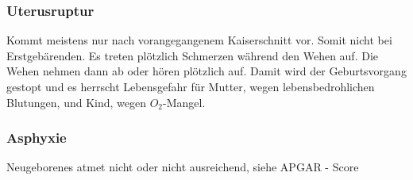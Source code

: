 \subsubsection{Uterusruptur}

Kommt meistens nur nach vorangegangenem Kaiserschnitt vor. Somit nicht bei
Erstgebärenden. Es treten plötzlich Schmerzen während den Wehen auf. Die Wehen
nehmen dann ab oder hören plötzlich auf. Damit wird der Geburtsvorgang gestopt
und es herrscht Lebensgefahr für Mutter, wegen lebensbedrohlichen Blutungen, und
Kind, wegen $O_2$-Mangel.


% 
% 
% 
% 

\subsubsection{Asphyxie}

Neugeborenes atmet nicht oder nicht  ausreichend, siehe APGAR - Score


